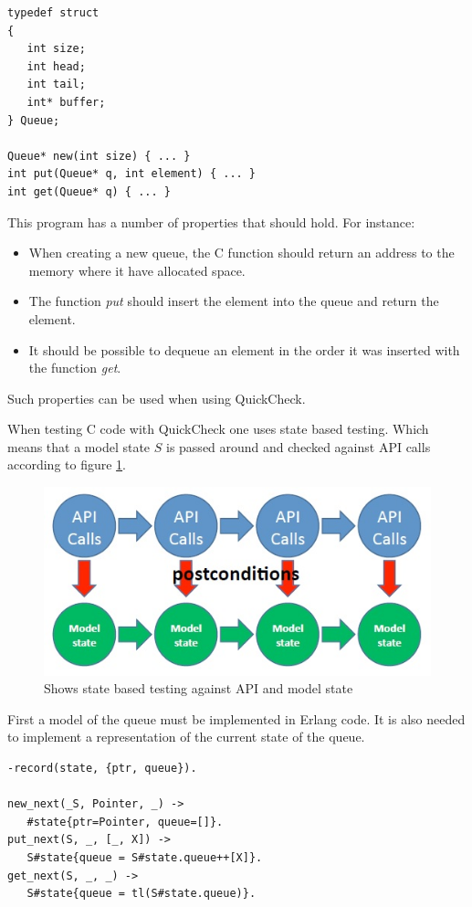 \begin{lstlisting}[style=c]
typedef struct
{
   int size;
   int head;
   int tail;
   int* buffer;
} Queue;

Queue* new(int size) { ... }
int put(Queue* q, int element) { ... }
int get(Queue* q) { ... }
\end{lstlisting}
This program has a number of properties that should hold. For
instance:
\begin{itemize}
\item When creating a new queue, the C function should return an
address to the memory where it have allocated space.
\item The function \emph{put} should insert the element into the queue
and return the element.
\item It should be possible to dequeue an element in the order it was
inserted with the function \emph{get}.
\end{itemize}
Such properties can be used when using QuickCheck.

When testing C code with QuickCheck one uses state based
testing. Which means that a model state $S$ is passed around and
checked against API calls according to figure \ref{FIG:API_CALLS}.

\begin{figure}[!h]
  \includegraphics{pictures/api_calls.jpg}
  \caption{Shows state based testing against API and model state}
  \label{FIG:API_CALLS}
\end{figure}
First a model of the queue must be implemented in Erlang code.
It is also needed to implement a representation of the current state of the queue.

\begin{lstlisting}
-record(state, {ptr, queue}).

new_next(_S, Pointer, _) ->
   #state{ptr=Pointer, queue=[]}.
put_next(S, _, [_, X]) ->
   S#state{queue = S#state.queue++[X]}.
get_next(S, _, _) ->
   S#state{queue = tl(S#state.queue)}.
\end{lstlisting}


